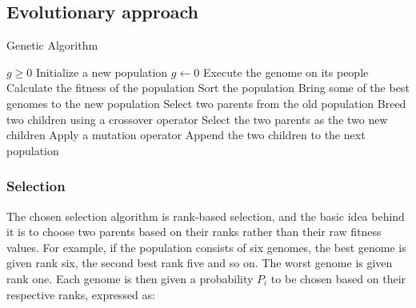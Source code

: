 \subsection{Evolutionary approach}

    \begin{algorithm}
        \caption{Genetic Algorithm}\label{alg:pseudocode_ga}
        \begin{algorithmic}
        \Require $g \geq 0$
        \State Initialize a new population
        \State $g \gets 0$
                \State Execute the genome on its people
            \EndFor
            \State Calculate the fitness of the population
            \State Sort the population
             
                \State Bring some of the best genomes to the new population
            \EndIf
                \State Select two parents from the old population
                    \State Breed two children using a crossover operator
                \Else
                    \State Select the two parents as the two new children
                \EndIf
                        \State Apply a mutation operator
                    \EndIf
                \EndFor
                \State Append the two children to the next population
            \EndWhile
        \EndWhile
        \end{algorithmic}
    \end{algorithm}

\subsubsection{Selection}

    The chosen selection algorithm is rank-based selection, and the basic idea behind it is to choose two parents based on their ranks rather than their raw fitness values. For example, if the population consists of six genomes, the best genome is given rank six, the second best rank five and so on. The worst genome is given rank one. Each genome is then given a probability $ P_i $ to be chosen based on their respective ranks, expressed as:

